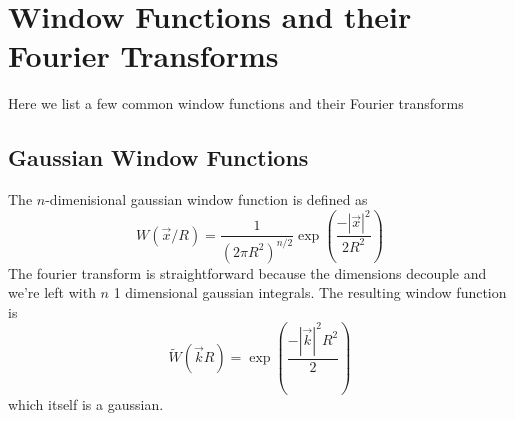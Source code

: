 \section{Window Functions and their Fourier Transforms}
\label{app:sec:Wtransforms}
Here we list a few common window functions and their Fourier transforms
\subsection{Gaussian Window Functions}
The $n$-dimenisional gaussian window function is defined as
\begin{equation}
  W(\vec x/R) = \frac{1}{(2\pi R^2)^{n/2}}
  \exp\left(\frac{-|\vec x|^2}{2R^2}\right)
\end{equation}
The fourier transform is straightforward because the dimensions decouple
and we're left with $n$ 1 dimensional gaussian integrals.  The resulting
window function is
\begin{equation}
  \widetilde{W}(\vec k R) 
  = \exp\left(\frac{-|\vec k|^2R^2}{2}\right)
\end{equation}
which itself is a gaussian.
